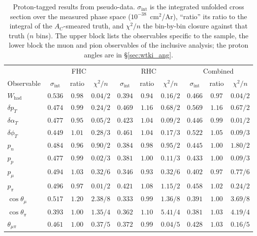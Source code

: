 \documentclass[11pt,a4paper]{article}
\begin{document}
\begin{table}[H]
  \centering
  \caption{Proton-tagged results from pseudo-data. $\sigma_\mathrm{int}$ is the integrated unfolded cross
    section over the measured phase space ($10^{-38}$~cm$^2$/Ar), ``ratio'' its ratio to the integral of the
    $A_C$-smeared truth, and $\chi^2/n$ the bin-by-bin closure against that truth ($n$ bins). The upper
    block lists the observables specific to the sample, the lower block the muon and pion observables of
    the inclusive analysis; the proton angles are in \S\ref{sec:wtki_ang}.}
  \label{tab:wtki}
  \footnotesize\setlength{\tabcolsep}{3.5pt}
  \begin{tabular}{lccccccccc}
\toprule
& \multicolumn{3}{c}{FHC} & \multicolumn{3}{c}{RHC} & \multicolumn{3}{c}{Combined} \\
\cmidrule(lr){2-4}\cmidrule(lr){5-7}\cmidrule(lr){8-10}
Observable & $\sigma_\mathrm{int}$ & ratio & $\chi^2/n$ & $\sigma_\mathrm{int}$ & ratio & $\chi^2/n$ & $\sigma_\mathrm{int}$ & ratio & $\chi^2/n$ \\
\midrule
      $W_\mathrm{had}$   & $0.536$ & $0.98$ & $0.04/2$ & $0.394$ & $0.94$ & $0.16/2$ & $0.466$ & $0.97$ & $0.04/2$ \\
      $\delta p_T$       & $0.474$ & $0.99$ & $0.24/2$ & $0.469$ & $1.16$ & $0.68/2$ & $0.569$ & $1.16$ & $0.67/2$ \\
      $\delta\alpha_T$   & $0.477$ & $0.95$ & $0.05/2$ & $0.423$ & $1.04$ & $0.09/2$ & $0.446$ & $0.99$ & $0.01/2$ \\
      $\delta\phi_T$     & $0.449$ & $1.01$ & $0.28/3$ & $0.461$ & $1.04$ & $0.17/3$ & $0.522$ & $1.05$ & $0.09/3$ \\
      $p_n$              & $0.484$ & $0.96$ & $0.90/2$ & $0.384$ & $0.98$ & $0.95/2$ & $0.445$ & $1.00$ & $1.80/2$ \\
      $p_p$              & $0.477$ & $0.99$ & $0.02/3$ & $0.381$ & $1.00$ & $0.11/3$ & $0.433$ & $1.00$ & $0.09/3$ \\
      \midrule
      $p_\mu$            & $0.494$ & $1.03$ & $0.32/6$ & $0.346$ & $0.93$ & $0.32/6$ & $0.402$ & $0.97$ & $0.77/6$ \\
      $p_\pi$            & $0.496$ & $0.97$ & $0.01/2$ & $0.421$ & $1.08$ & $1.15/2$ & $0.458$ & $1.02$ & $0.24/2$ \\
      $\cos\theta_\mu$   & $0.517$ & $1.20$ & $2.38/8$ & $0.333$ & $0.99$ & $1.36/8$ & $0.391$ & $1.00$ & $3.69/8$ \\
      $\cos\theta_\pi$   & $0.393$ & $1.00$ & $1.35/4$ & $0.362$ & $1.10$ & $5.41/4$ & $0.381$ & $1.03$ & $4.19/4$ \\
      $\theta_{\mu\pi}$  & $0.461$ & $1.00$ & $0.37/5$ & $0.372$ & $0.99$ & $0.04/5$ & $0.428$ & $1.03$ & $0.16/5$ \\
\bottomrule
\end{tabular}
\end{table}
\end{document}
